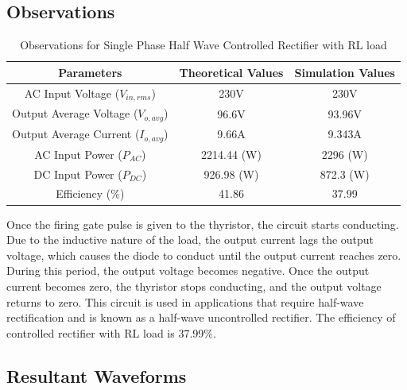 \subsection{Observations}

\begin{table}[h]
    \renewcommand{\arraystretch}{1.3}
    \label{table_observation_6}
    \centering
    \begin{tabular}{|c|c|c|}
        \hline
        Parameters                              & Theoretical Values & Simulation Values \\
        \hline
        \hline
        AC Input Voltage ($ V_{in,rms} $)       & 230V               & 230V              \\
        \hline
        Output Average Voltage ($ V_{o,avg} $)  & 96.6V              & 93.96V            \\
        \hline
        Output Average Current ($ I_{o,avg}  $) & 9.66A              & 9.343A            \\
        \hline
        AC Input Power ($ P_{AC}  $)            & 2214.44 (W)        & 2296 (W)          \\
        \hline
        DC Input Power ($ P_{DC}  $)            & 926.98 (W)         & 872.3 (W)         \\
        \hline
        Efficiency (\%)                         & 41.86              & 37.99             \\
        \hline
    \end{tabular}
    \caption{Observations for Single Phase Half Wave Controlled Rectifier with RL load}

\end{table}


 Once the firing gate pulse is given to the thyristor, the circuit starts conducting. Due to the inductive nature of the load, the output current lags the output voltage, which causes the diode to conduct until the output current reaches zero. During this period, the output voltage becomes negative. Once the output current becomes zero, the thyristor stops conducting, and the output voltage returns to zero. This circuit is used in applications that require half-wave rectification and is known as a half-wave uncontrolled rectifier.
The efficiency of controlled
rectifier with RL load is 37.99\%.



\subsection{Resultant Waveforms}


